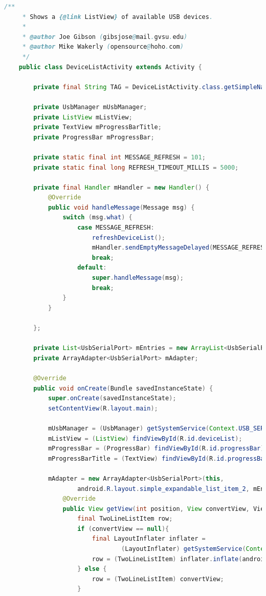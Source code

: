 \documentclass{article}
\numberwithin{figure}{section}
\numberwithin{equation}{section}
\begin{document}
{\begin{lstlisting}[language=Java,label=lst:devicelist,caption=DeviceListActivity.java]
    /**
     * Shows a {@link ListView} of available USB devices.
     *
     * @author Joe Gibson (gibsjose@mail.gvsu.edu)
     * @author Mike Wakerly (opensource@hoho.com)
     */
    public class DeviceListActivity extends Activity {

        private final String TAG = DeviceListActivity.class.getSimpleName();

        private UsbManager mUsbManager;
        private ListView mListView;
        private TextView mProgressBarTitle;
        private ProgressBar mProgressBar;

        private static final int MESSAGE_REFRESH = 101;
        private static final long REFRESH_TIMEOUT_MILLIS = 5000;

        private final Handler mHandler = new Handler() {
            @Override
            public void handleMessage(Message msg) {
                switch (msg.what) {
                    case MESSAGE_REFRESH:
                        refreshDeviceList();
                        mHandler.sendEmptyMessageDelayed(MESSAGE_REFRESH, REFRESH_TIMEOUT_MILLIS);
                        break;
                    default:
                        super.handleMessage(msg);
                        break;
                }
            }

        };

        private List<UsbSerialPort> mEntries = new ArrayList<UsbSerialPort>();
        private ArrayAdapter<UsbSerialPort> mAdapter;

        @Override
        public void onCreate(Bundle savedInstanceState) {
            super.onCreate(savedInstanceState);
            setContentView(R.layout.main);

            mUsbManager = (UsbManager) getSystemService(Context.USB_SERVICE);
            mListView = (ListView) findViewById(R.id.deviceList);
            mProgressBar = (ProgressBar) findViewById(R.id.progressBar);
            mProgressBarTitle = (TextView) findViewById(R.id.progressBarTitle);

            mAdapter = new ArrayAdapter<UsbSerialPort>(this,
                    android.R.layout.simple_expandable_list_item_2, mEntries) {
                @Override
                public View getView(int position, View convertView, ViewGroup parent) {
                    final TwoLineListItem row;
                    if (convertView == null){
                        final LayoutInflater inflater =
                                (LayoutInflater) getSystemService(Context.LAYOUT_INFLATER_SERVICE);
                        row = (TwoLineListItem) inflater.inflate(android.R.layout.simple_list_item_2, null);
                    } else {
                        row = (TwoLineListItem) convertView;
                    }


\end{lstlisting}}
\end{document}

